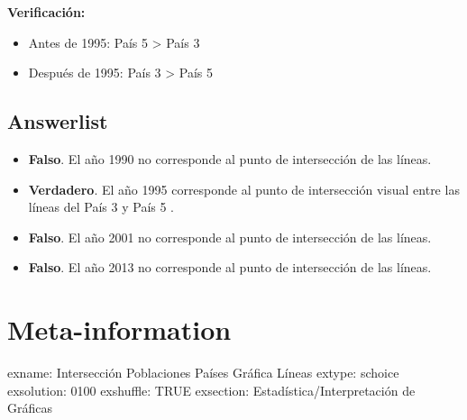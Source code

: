 \documentclass[
]{article}
\providecommand{\tightlist}{%
  \setlength{\itemsep}{0pt}\setlength{\parskip}{0pt}}
\begin{document}
\textbf{Verificación:}

\begin{itemize}
\tightlist
\item
  Antes de 1995: País 5 \textgreater{} País 3
\item
  Después de 1995: País 3 \textgreater{} País 5
\end{itemize}

\subsection{Answerlist}\label{answerlist-1}

\begin{itemize}
\tightlist
\item
  \textbf{Falso}. El año 1990 no corresponde al punto de intersección de
  las líneas.
\item
  \textbf{Verdadero}. El año 1995 corresponde al punto de intersección
  visual entre las líneas del País 3 y País 5 .
\item
  \textbf{Falso}. El año 2001 no corresponde al punto de intersección de
  las líneas.
\item
  \textbf{Falso}. El año 2013 no corresponde al punto de intersección de
  las líneas.
\end{itemize}

\section{Meta-information}\label{meta-information}

exname: Intersección Poblaciones Países Gráfica Líneas extype: schoice
exsolution: 0100 exshuffle: TRUE exsection: Estadística/Interpretación
de Gráficas
\end{document}
